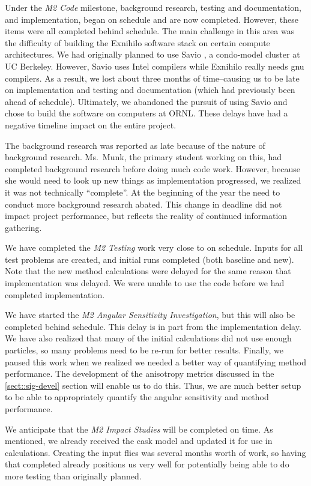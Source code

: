 \documentclass[12pt]{article}
\begin{document}
Under the \textit{M2 Code} milestone, background research, testing and documentation, and implementation, began on schedule and are now completed. 
However, these items were all completed behind schedule. 
The main challenge in this area was the difficulty of building the Exnihilo software stack on certain compute architectures. 
We had originally planned to use Savio \cite{savio}, a condo-model cluster at UC Berkeley. 
However, Savio uses Intel compilers while Exnihilo really needs gnu compilers. 
As a result, we lost about three months of time--causing us to be late on implementation and testing and documentation (which had previously been ahead of schedule).
Ultimately, we abandoned the pursuit of using Savio and chose to build the software on computers at ORNL.
These delays have had a negative timeline impact on the entire project. 

The background research was reported as late because of the nature of background research. 
Ms.\ Munk, the primary student working on this, had completed background research before doing much code work.
However, because she would need to look up new things as implementation progressed, we realized it was not technically ``complete''.
At the beginning of the year the need to conduct more background research abated. 
This change in deadline did not impact project performance, but reflects the reality of continued information gathering.

We have completed the \textit{M2 Testing} work very close to on schedule. 
Inputs for all test problems are created, and initial runs completed (both baseline and new). 
Note that the new method calculations were delayed for the same reason that implementation was delayed.
We were unable to use the code before we had completed implementation. 

We have started the \textit{M2 Angular Sensitivity Investigation}, but this will also be completed behind schedule. 
This delay is in part from the implementation delay. 
We have also realized that many of the initial calculations did not use enough particles, so many problems need to be re-run for better results.
Finally, we paused this work when we realized we needed a better way of quantifying method performance. 
The development of the anisotropy metrics discussed in the \autoref{sect::sig-devel} section will enable us to do this.
Thus, we are much better setup to be able to appropriately quantify the angular sensitivity and method performance. 

We anticipate that the \textit{M2 Impact Studies} will be completed on time. 
As mentioned, we already received the cask model and updated it for use in calculations. 
Creating the input flies was several months worth of work, so having that completed already positions us very well for potentially being able to do more testing than originally planned. 
\end{document}
